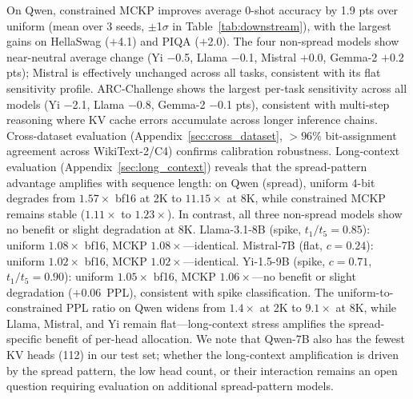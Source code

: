 On Qwen, constrained MCKP improves average 0-shot accuracy by 1.9 pts over uniform (mean over 3 seeds, $\pm$1$\sigma$ in Table~\ref{tab:downstream}), with the largest gains on HellaSwag ($+$4.1) and PIQA ($+$2.0).
The four non-spread models show near-neutral average change (Yi $-$0.5, Llama $-$0.1, Mistral $+$0.0, Gemma-2 $+$0.2 pts); Mistral is effectively unchanged across all tasks, consistent with its flat sensitivity profile.
ARC-Challenge shows the largest per-task sensitivity across all models (Yi $-$2.1, Llama $-$0.8, Gemma-2 $-$0.1 pts), consistent with multi-step reasoning where KV cache errors accumulate across longer inference chains.
Cross-dataset evaluation (Appendix~\ref{sec:cross_dataset}, ${>}96\%$ bit-assignment agreement across WikiText-2/C4) confirms calibration robustness.
Long-context evaluation (Appendix~\ref{sec:long_context}) reveals that the spread-pattern advantage amplifies with sequence length: on Qwen (spread), uniform 4-bit degrades from $1.57\times$ bf16 at 2K to $11.15\times$ at 8K, while constrained MCKP remains stable ($1.11\times$ to $1.23\times$).
In contrast, all three non-spread models show no benefit or slight degradation at 8K.
Llama-3.1-8B (spike, $t_1/t_5{=}0.85$): uniform $1.08\times$ bf16, MCKP $1.08\times$---identical.
Mistral-7B (flat, $c{=}0.24$): uniform $1.02\times$ bf16, MCKP $1.02\times$---identical.
Yi-1.5-9B (spike, $c{=}0.71$, $t_1/t_5{=}0.90$): uniform $1.05\times$ bf16, MCKP $1.06\times$---no benefit or slight degradation ($+$0.06~PPL), consistent with spike classification.
The uniform-to-constrained PPL ratio on Qwen widens from $1.4\times$ at 2K to $9.1\times$ at 8K, while Llama, Mistral, and Yi remain flat---long-context stress amplifies the spread-specific benefit of per-head allocation.
We note that Qwen-7B also has the fewest KV heads (112) in our test set; whether the long-context amplification is driven by the spread pattern, the low head count, or their interaction remains an open question requiring evaluation on additional spread-pattern models.